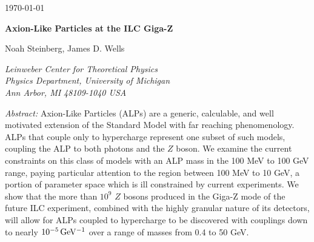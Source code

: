 \documentclass[aps,onecolumn,twoside,secnumarabic,12pt,balancelastpage,amsmath,amssymb,nofootinbib,hyperref=pdftex]{revtex4}
\begin{document}
\begin{flushright}
\today
\end{flushright}

\vspace{0.07in}

\noindent
\begin{center}

{\bf\large Axion-Like Particles at the ILC Giga-Z}

\vspace{0.5cm}
{Noah Steinberg, James D. Wells}

{\it Leinweber Center for Theoretical Physics \\
Physics Department, University of Michigan \\
Ann Arbor, MI 48109-1040 USA}\\
\end{center}

\noindent
{\it Abstract:}
Axion-Like Particles (ALPs) are a generic, calculable, and well motivated extension of the Standard Model with far reaching phenomenology. ALPs that couple only to hypercharge represent one subset of such models, coupling the ALP to both photons and the $Z$ boson. We examine the current constraints on this class of models with an ALP mass in the 100 MeV to 100 GeV range, paying particular attention to the region between 100 MeV to 10 GeV, a portion of parameter space which is ill constrained by current experiments. We show that the more than $10^{9}$ $Z$ bosons produced in the Giga-Z mode of the future ILC experiment, combined with the highly granular nature of its detectors, will allow for ALPs coupled to hypercharge to be discovered with couplings down to nearly $10^{-5}\,\rm{GeV^{-1}}$ over a range of masses from 0.4 to 50 GeV.
\vfill\eject
\end{document}
